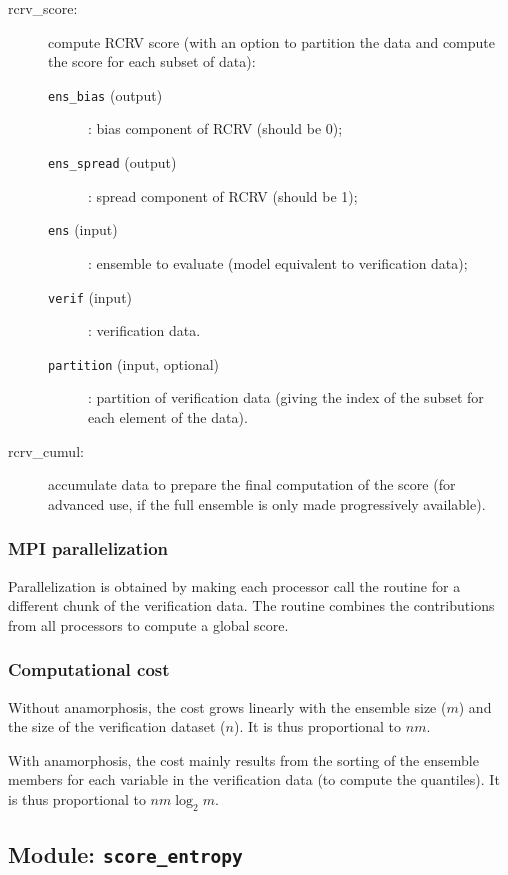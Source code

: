 \documentclass[11pt]{article}
\begin{document}
\begin{description}
\item[rcrv\_score:] compute RCRV score (with an option to partition the data
                    and compute the score for each subset of data):
  \begin{description}
  \item[{\tt ens\_bias} (output)]: bias component of RCRV (should be 0);
  \item[{\tt ens\_spread} (output)]: spread component of RCRV (should be 1);
  \item[{\tt ens} (input)]: ensemble to evaluate (model equivalent to verification data);
  \item[{\tt verif} (input)]: verification data.
  \item[{\tt partition} (input, optional)]: partition of verification data
                                  (giving the index of the subset for each element of the data).
  \end{description}
\item[rcrv\_cumul:] accumulate data to prepare the final computation of the score
                    (for advanced use, if the full ensemble is only made progressively available).
\end{description}

\subsubsection*{MPI parallelization}

Parallelization is obtained by making each processor call the routine
for a different chunk of the verification data.
The routine combines the contributions from all processors
to compute a global score.

\subsubsection*{Computational cost}

Without anamorphosis, the cost grows linearly with the ensemble size ($m$)
and the size of the verification dataset ($n$).
It is thus proportional to $n m$.

\noindent
With anamorphosis, the cost mainly results from the sorting of the ensemble members
for each variable in the verification data (to compute the quantiles).
It is thus proportional to $n m \log_2 m$.

\subsection{Module: {\tt\bf score\_entropy}}
\end{document}
